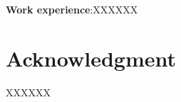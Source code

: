 \documentclass[12pt]{article}
\begin{document}
\begin{CJK*}{UTF8}{bsmi}
\textbf{Work experience}:XXXXXX






\newpage



{}
\section*{Acknowledgment}

XXXXXX






\newpage
\end{CJK*}
\end{document}
